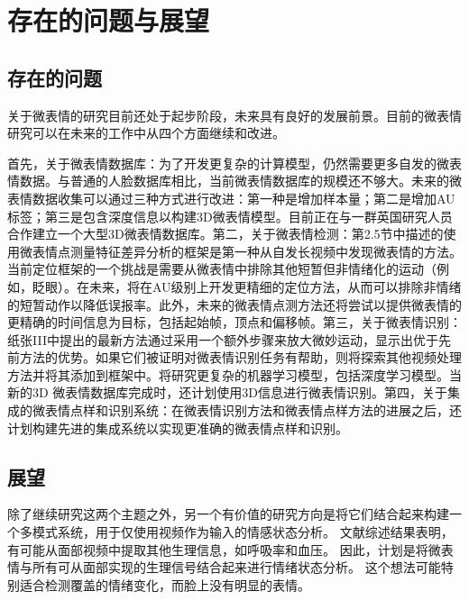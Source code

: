 \section{存在的问题与展望}

\subsection{存在的问题}

关于微表情的研究目前还处于起步阶段，未来具有良好的发展前景。目前的微表情研究可以在未来的工作中从四个方面继续和改进。

首先，关于微表情数据库：为了开发更复杂的计算模型，仍然需要更多自发的微表情数据。与普通的人脸数据库相比，当前微表情数据库的规模还不够大。未来的微表情数据收集可以通过三种方式进行改进：第一种是增加样本量；第二是增加AU标签；第三是包含深度信息以构建3D微表情模型。目前正在与一群英国研究人员合作建立一个大型3D微表情数据库。第二，关于微表情检测：第2.5节中描述的使用微表情点测量特征差异分析的框架是第一种从自发长视频中发现微表情的方法。当前定位框架的一个挑战是需要从微表情中排除其他短暂但非情绪化的运动（例如，眨眼）。在未来，将在AU级别上开发更精细的定位方法，从而可以排除非情绪的短暂动作以降低误报率。此外，未来的微表情点测方法还将尝试以提供微表情的更精确的时间信息为目标，包括起始帧，顶点和偏移帧。第三，关于微表情识别：纸张III中提出的最新方法通过采用一个额外步骤来放大微妙运动，显示出优于先前方法的优势。如果它们被证明对微表情识别任务有帮助，则将探索其他视频处理方法并将其添加到框架中。将研究更复杂的机器学习模型，包括深度学习模型。当新的3D 微表情数据库完成时，还计划使用3D信息进行微表情识别。第四，关于集成的微表情点样和识别系统：在微表情识别方法和微表情点样方法的进展之后，还计划构建先进的集成系统以实现更准确的微表情点样和识别。

\subsection{展望}

除了继续研究这两个主题之外，另一个有价值的研究方向是将它们结合起来构建一个多模式系统，用于仅使用视频作为输入的情感状态分析。 文献综述结果表明，有可能从面部视频中提取其他生理信息，如呼吸率和血压。 因此，计划是将微表情与所有可从面部实现的生理信号结合起来进行情绪状态分析。 这个想法可能特别适合检测覆盖的情绪变化，而脸上没有明显的表情。
